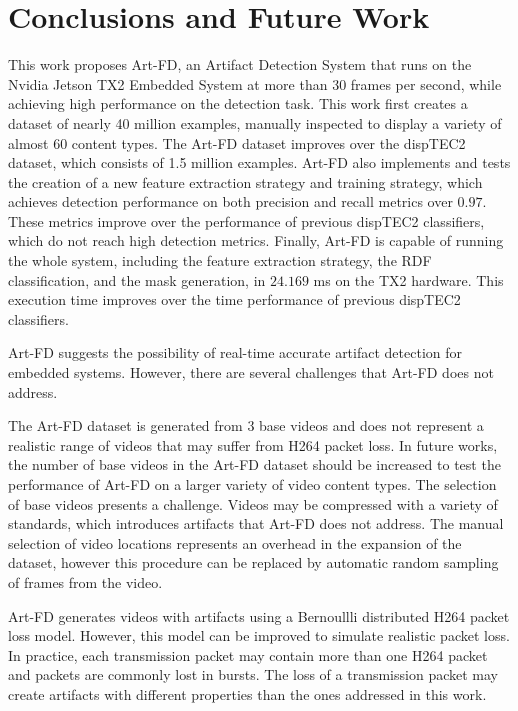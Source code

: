 \chapter{Conclusions and Future Work}
\label{chp:conclusions}

This work proposes Art-FD, an Artifact Detection System that runs on the Nvidia Jetson TX2 Embedded System at more than 30 frames per second, while achieving high performance on the detection task. This work first creates a dataset of nearly 40 million examples, manually inspected to display a variety of almost 60 content types. The Art-FD dataset improves over the dispTEC2 dataset, which consists of 1.5 million examples. Art-FD also implements and tests the creation of a new feature extraction strategy and training strategy, which achieves detection performance on both precision and recall metrics over $0.97$. These metrics improve over the performance of previous dispTEC2 classifiers, which do not reach high detection metrics. Finally, Art-FD is capable of running the whole system, including the feature extraction strategy, the RDF classification, and the mask generation, in $24.169$ ms on the TX2 hardware. This execution time improves over the time performance of previous dispTEC2 classifiers.

Art-FD suggests the possibility of real-time accurate artifact detection for embedded systems. However, there are several challenges that Art-FD does not address.

The Art-FD dataset is generated from 3 base videos and does not represent a realistic range of videos that may suffer from H264 packet loss. In future works, the number of base videos in the Art-FD dataset should be increased to test the performance of Art-FD on a larger variety of video content types. The selection of base videos presents a challenge. Videos may be compressed with a variety of standards, which introduces artifacts that Art-FD does not address. The manual selection of video locations represents an overhead in the expansion of the dataset, however this procedure can be replaced by automatic random sampling of frames from the video.

Art-FD generates videos with artifacts using a Bernoullli distributed H264 packet loss model. However, this model can be improved to simulate realistic packet loss. In practice, each transmission packet may contain more than one H264 packet and packets are commonly lost in bursts. The loss of a transmission packet may create artifacts with different properties than the ones addressed in this work.

